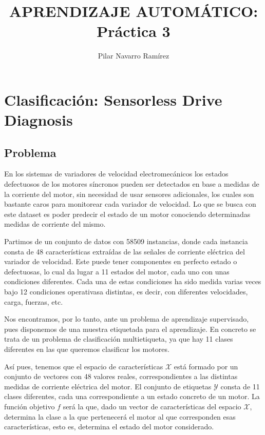 \documentclass[a4]{article}
\author{Pilar Navarro Ramírez}
\date{\vspace{-5mm}}
\title{\huge APRENDIZAJE AUTOMÁTICO: Práctica 3 \HRule\vspace{-4mm}}
\begin{document}
\maketitle
\tableofcontents

\newpage

\section{Clasificación: Sensorless Drive Diagnosis}
\subsection{Problema}

En los sistemas de variadores de velocidad electromecánicos los estados defectuosos de los motores síncronos pueden ser detectados en base a medidas de la corriente del motor, sin necesidad de usar sensores adicionales, los cuales son bastante caros para monitorear cada variador de velocidad. Lo que se busca con este dataset es poder predecir el estado de un motor conociendo determinadas medidas de corriente del mismo. 

Partimos de un conjunto de datos con 58509 instancias, donde cada instancia consta de 48 características extraídas de las señales de corriente eléctrica del variador de velocidad. Este puede tener componentes en perfecto estado o defectuosas, lo cual da lugar a 11 estados del motor, cada uno con unas condiciones diferentes. Cada una de estas condiciones ha sido medida varias veces bajo 12 condiciones operativasa distintas, es decir, con diferentes velocidades, carga, fuerzas, etc. 

Nos encontramos, por lo tanto, ante un problema de aprendizaje supervisado, pues disponemos de una muestra etiquetada para el aprendizaje. En concreto se trata de un problema de clasificación multietiqueta, ya que hay 11 clases diferentes en las que queremos clasificar los motores. 

Así pues, tenemos que el espacio de características $\mathcal{X}$ está formado por un conjunto de vectores con 48 valores reales, correspondientes a las distintas medidas de corriente eléctrica del motor. El conjunto de etiquetas $\mathcal{Y}$ consta de 11 clases diferentes, cada una correspondiente a un estado concreto de un motor. La función objetivo $ f $ será la que, dado un vector de características del espacio $\mathcal{X}$, determina la clase a la que pertenecerá el motor al que corresponden esas características, esto es, determina el estado del  motor considerado. 
\end{document}
